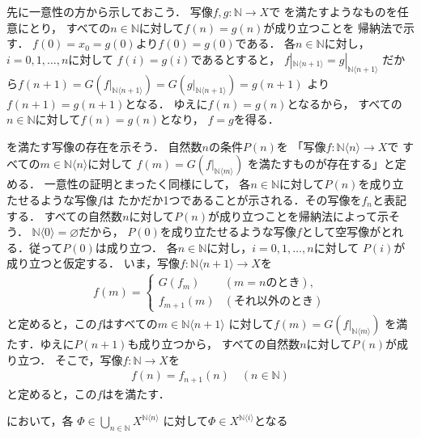 \documentclass[11pt,a4paper]{ltjsarticle} %
\makeatletter
\theoremstyle{mystyle} %
\renewenvironment{proof}[1][\proofname]{\par
  \pushQED{\qed}%
  \normalfont \topsep6\p@\@plus6\p@\relax
  \trivlist
\item[\hskip\labelsep
  \itshape
  #1]\ignorespaces%
  }{%
  \popQED\endtrivlist\@endpefalse
}
\renewcommand{\proofname}{\textbf{［証明］}}
\makeatother
\begin{document}
\begin{proof}
  先に一意性の方から示しておこう．
  写像$f,g \colon \mathbb{N} \longrightarrow X$で
  を満たすようなものを任意にとり，
  すべての$n \in \mathbb{N}$に対して$f(n) = g(n)$が成り立つことを
  帰納法で示す．
  $f(0) = x_0 = g(0)$より$f(0)=g(0)$である．
  各$n \in \mathbb{N}$に対し，$i= 0,1, \ldots, n$に対して
  $f(i)=g(i)$であるとすると，
  $f|_{\mathbb{N} \langle n+1 \rangle} = g|_{\mathbb{N} \langle n+1 \rangle} $
  だから$f(n+1) = G \left( f|_{\mathbb{N} \langle n+1 \rangle} \right) =
  G \left ( g |_{\mathbb{N} \langle n+1 \rangle} \right) = g(n+1)$
  より$f(n+1) =g(n+1)$となる．
  ゆえに$f(n) = g(n)$となるから，
  すべての$n \in \mathbb{N}$に対して$f(n) = g(n)$となり，
  $f=g$を得る．

  を満たす写像の存在を示そう．
  自然数$n$の条件$P(n)$を
  「写像$f \colon \mathbb{N} \langle n \rangle \longrightarrow X$で
  すべての$m \in \mathbb{N} \langle n \rangle$に対して
  $f(m) = G \left( f|_{\mathbb{N} \langle m \rangle } \right)$
  を満たすものが存在する」と定める．
  一意性の証明とまったく同様にして，
  各$n \in \mathbb{N}$に対して$P(n)$を成り立たせるような写像$f$は
  たかだか1つであることが示される．その写像を$f_n$と表記する．
  すべての自然数$n$に対して$P(n)$が成り立つことを帰納法によって示そう．
  $\mathbb{N} \langle 0 \rangle = \varnothing$だから，
  $P(0)$を成り立たせるような写像$f$として空写像がとれる．従って$P(0)$は成り立つ．
  各$n \in \mathbb{N}$に対し，$i=0,1,\ldots,n$に対して
  $P(i)$が成り立つと仮定する．
  いま，写像$f \colon \mathbb{N} \langle n+1 \rangle \longrightarrow X$を
  \begin{align*}
    f (m) = 
    \begin{cases}
      G \left( f_{m} \right) & ( \text{$m=n$のとき} ) , \\
      f_{m+1} (m) & (\text{それ以外のとき})
    \end{cases}
  \end{align*}
  と定めると，この$f$はすべての$m \in \mathbb{N} \langle n+1 \rangle$
  に対して$f(m) = G \left( f|_{\mathbb{N} \langle m \rangle} \right)$
  を満たす．ゆえに$P(n+1)$も成り立つから，
  すべての自然数$n$に対して$P(n)$が成り立つ．
  そこで，写像$f \colon \mathbb{N} \longrightarrow X$を
  \begin{align*}
    f(n) = f_{n+1} (n) \quad ( n \in \mathbb{N} )
  \end{align*}
  と定めると，この$f$はを満たす．
\end{proof}

において，各
$\varPhi \in \bigcup_{n \in \mathbb{N}} X^{\mathbb{N} \langle n \rangle}$
に対して$\varPhi \in X^{ \mathbb{N} \langle i \rangle}$となる

%
\printbibliography[title=参考文献]
\end{document}

